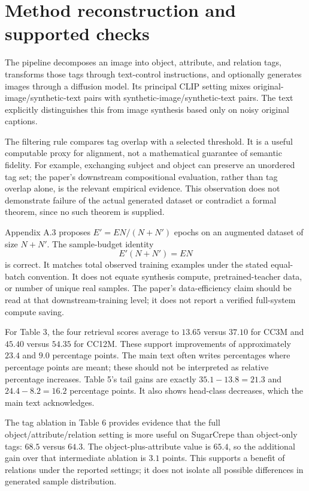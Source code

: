 \documentclass[10pt]{article}
\begin{document}
\section*{Method reconstruction and supported checks}
The pipeline decomposes an image into object, attribute, and relation tags, transforms those tags through text-control instructions, and optionally generates images through a diffusion model. Its principal CLIP setting mixes original-image/synthetic-text pairs with synthetic-image/synthetic-text pairs. The text explicitly distinguishes this from image synthesis based only on noisy original captions.\par
The filtering rule compares tag overlap with a selected threshold. It is a useful computable proxy for alignment, not a mathematical guarantee of semantic fidelity. For example, exchanging subject and object can preserve an unordered tag set; the paper’s downstream compositional evaluation, rather than tag overlap alone, is the relevant empirical evidence. This observation does not demonstrate failure of the actual generated dataset or contradict a formal theorem, since no such theorem is supplied.\par
Appendix A.3 proposes \(E'=EN/(N+N')\) epochs on an augmented dataset of size \(N+N'\). The sample-budget identity \[E'(N+N')=EN\] is correct. It matches total observed training examples under the stated equal-batch convention. It does not equate synthesis compute, pretrained-teacher data, or number of unique real samples. The paper’s data-efficiency claim should be read at that downstream-training level; it does not report a verified full-system compute saving.\par
For Table 3, the four retrieval scores average to \(13.65\) versus \(37.10\) for CC3M and \(45.40\) versus \(54.35\) for CC12M. These support improvements of approximately \(23.4\) and \(9.0\) percentage points. The main text often writes percentages where percentage points are meant; these should not be interpreted as relative percentage increases. Table 5’s tail gains are exactly \(35.1-13.8=21.3\) and \(24.4-8.2=16.2\) percentage points. It also shows head-class decreases, which the main text acknowledges.\par
The tag ablation in Table 6 provides evidence that the full object/attribute/relation setting is more useful on SugarCrepe than object-only tags: \(68.5\) versus \(64.3\). The object-plus-attribute value is \(65.4\), so the additional gain over that intermediate ablation is \(3.1\) points. This supports a benefit of relations under the reported settings; it does not isolate all possible differences in generated sample distribution.\par
\end{document}
